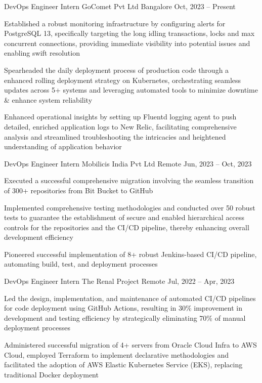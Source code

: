 \documentclass[]{awesome-cv}
\begin{document}
\begin{cventries}
    \cventry
    {DevOps Engineer Intern}
    {GoComet Pvt Ltd}
    {Bangalore}
    {Oct, 2023 – Present}
    {\begin{cvitems}
            \item {Established a robust monitoring infrastructure by configuring alerts for PostgreSQL 13, specifically targeting the long idling transactions, locks and max concurrent connections, providing immediate visibility into potential issues and enabling swift resolution}
            \item {Spearheaded the daily deployment process of production code through a enhanced rolling deployment strategy on Kubernetes, orchestrating seamless updates across 5+ systems and leveraging automated tools to minimize downtime \& enhance system reliability}
            \item {Enhanced operational insights by setting up Fluentd logging agent to push detailed, enriched application logs to New Relic, facilitating comprehensive analysis and streamlined troubleshooting the intricacies and heightened understanding of application behavior}
        \end{cvitems}}
    \cventry
    {DevOps Engineer Intern}
    {Mobilicis India Pvt Ltd}
    {Remote}
    {Jun, 2023 – Oct, 2023}
    {\begin{cvitems}
            \item {Executed a successful comprehensive migration involving the seamless transition of 300+ repositories from Bit Bucket to GitHub}
            \item {Implemented comprehensive testing methodologies and conducted over 50 robust tests to guarantee the establishment of secure and enabled hierarchical access controls for the repositories and the CI/CD pipeline, thereby enhancing overall development efficiency}
            \item {Pioneered successful implementation of 8+ robust Jenkins-based CI/CD pipeline, automating build, test, and deployment processes}
        \end{cvitems}}
    \cventry
    {DevOps Engineer Intern}
    {The Renal Project}
    {Remote}
    {Jul, 2022 – Apr, 2023}
    {\begin{cvitems}
            \item {Led the design, implementation, and maintenance of automated CI/CD pipelines for code deployment using GitHub Actions, resulting in 30\% improvement in development and testing efficiency by strategically eliminating 70\% of manual deployment processes}
            \item {Administered successful migration of 4+ servers from Oracle Cloud Infra to AWS Cloud, employed Terraform to implement declarative methodologies and facilitated the adoption of AWS Elastic Kubernetes Service (EKS), replacing traditional Docker deployment}
        \end{cvitems}}
\end{cventries}
\vspace{-5mm}
\end{document}
